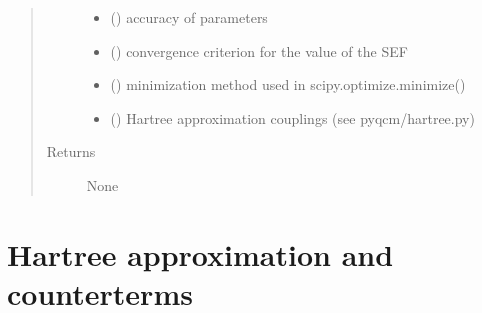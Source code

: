\documentclass[letterpaper,10pt,english]{sphinxmanual}
\begin{document}
\begin{fulllineitems}
\begin{quote}
\begin{description}
\begin{itemize}
\item {} 
\sphinxAtStartPar
{} () \textendash{} accuracy of parameters

\item {} 
\sphinxAtStartPar
{} () \textendash{} convergence criterion for the value of the SEF

\item {} 
\sphinxAtStartPar
{} () \textendash{} minimization method used in scipy.optimize.minimize()

\item {} 
\sphinxAtStartPar
{} (\sphinxstyleliteralemphasis{\sphinxupquote{(}}\sphinxstyleliteralemphasis{\sphinxupquote{)}}) \textendash{} Hartree approximation couplings (see pyqcm/hartree.py)

\end{itemize}

\item[{Returns}] \leavevmode
\sphinxAtStartPar
None

\end{description}\end{quote}

\end{fulllineitems}



\chapter{Hartree approximation and counterterms}
\label{\detokenize{utilities:hartree-approximation-and-counterterms}}\label{\detokenize{utilities::doc}}
\end{document}
